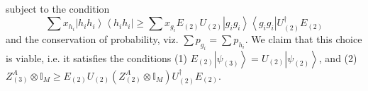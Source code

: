 \documentclass{theoretics}
\begin{document}
\begin{enumerate}
\begin{footnotesize}
        \end{footnotesize}

        subject to the condition
        \begin{equation}
          \sum x_{h_{i}}\left|h_{i}h_{i}\right\rangle \left\langle h_{i}h_{i}\right|\ge\sum x_{g_{i}}E_{(2)}U_{(2)}\left|g_{i}g_{i}\right\rangle \left\langle g_{i}g_{i}\right|U_{(2)}^\dagger E_{(2)}\label{eq:MainConstraintInequality}
        \end{equation}
        and the conservation of probability, viz. $\sum p_{g_{i}}=\sum p_{h_{i}}$.
        We claim that this choice is viable, i.e. it satisfies the conditions
        (1) $E_{(2)}\left|\psi_{(3)}\right\rangle =U_{(2)}\left|\psi_{(2)}\right\rangle$, and (2) $Z_{(3)}^{A}\otimes\mathbb{I}_{M}\ge E_{(2)}U_{(2)}\left(Z_{(2)}^{A}\otimes\mathbb{I}_{M}\right)U^\dagger_{(2)}E_{(2)}.$


\end{enumerate}
\end{document}
